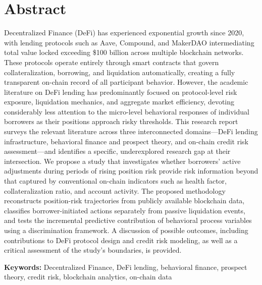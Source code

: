 \section*{Abstract}

Decentralized Finance (DeFi) has experienced exponential growth since 2020, with lending protocols such as Aave, Compound, and MakerDAO intermediating total value locked exceeding \$100 billion across multiple blockchain networks. These protocols operate entirely through smart contracts that govern collateralization, borrowing, and liquidation automatically, creating a fully transparent on-chain record of all participant behavior. However, the academic literature on DeFi lending has predominantly focused on protocol-level risk exposure, liquidation mechanics, and aggregate market efficiency, devoting considerably less attention to the micro-level behavioral responses of individual borrowers as their positions approach risky thresholds. This research report surveys the relevant literature across three interconnected domains—DeFi lending infrastructure, behavioral finance and prospect theory, and on-chain credit risk assessment—and identifies a specific, underexplored research gap at their intersection. We propose a study that investigates whether borrowers' active adjustments during periods of rising position risk provide risk information beyond that captured by conventional on-chain indicators such as health factor, collateralization ratio, and account activity. The proposed methodology reconstructs position-risk trajectories from publicly available blockchain data, classifies borrower-initiated actions separately from passive liquidation events, and tests the incremental predictive contribution of behavioral process variables using a discrimination framework. A discussion of possible outcomes, including contributions to DeFi protocol design and credit risk modeling, as well as a critical assessment of the study's boundaries, is provided.

\vspace{8pt}
\noindent\textbf{Keywords:} Decentralized Finance, DeFi lending, behavioral finance, prospect theory, credit risk, blockchain analytics, on-chain data
